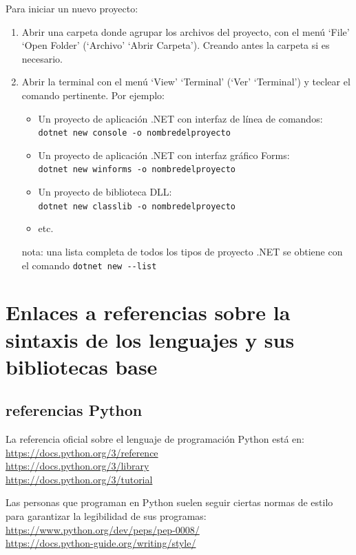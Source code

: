 \documentclass[spanish,12pt,a4paper,final,oneside]{book}
\begin{document}
\vspace{0.5cm}
Para iniciar un nuevo proyecto:
\begin{enumerate}
\item Abrir una carpeta donde agrupar los archivos del proyecto, con el menú `File' `Open Folder' (`Archivo' `Abrir Carpeta'). Creando antes la carpeta si es necesario.
\item Abrir la terminal con el menú `View' `Terminal' (`Ver' `Terminal') y teclear el comando pertinente. Por ejemplo:
\begin{itemize}
\item Un proyecto de aplicación .NET con interfaz de línea de comandos: \\ \verb!dotnet new console -o nombredelproyecto!
\item Un proyecto de aplicación .NET con interfaz gráfico Forms: \\ \verb!dotnet new winforms -o nombredelproyecto!
\item Un proyecto de biblioteca DLL: \\ \verb!dotnet new classlib -o nombredelproyecto!
\item etc.
\end{itemize} 
nota: una lista completa de todos los tipos de proyecto .NET se obtiene con el comando \verb!dotnet new --list!
\end{enumerate}


\section{Enlaces a referencias sobre la sintaxis de los lenguajes y sus bibliotecas base}


\subsection{referencias Python}

La referencia oficial sobre el lenguaje de programación Python está en:
\\ \url{https://docs.python.org/3/reference}
\\ \url{https://docs.python.org/3/library}
\\ \url{https://docs.python.org/3/tutorial}

Las personas que programan en Python suelen seguir ciertas normas de estilo para garantizar la legibilidad de sus programas:
\\ \url{https://www.python.org/dev/peps/pep-0008/}
\\ \url{https://docs.python-guide.org/writing/style/}
\end{document}
